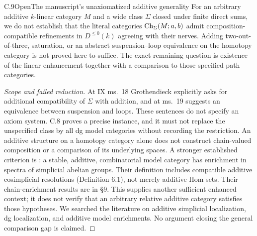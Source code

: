 \begin{result}{C.9}{Open}{The manuscript's unaxiomatized additive generality}
For an arbitrary additive $k$-linear category $M$ and a wide class $\Sigma$ closed under finite direct sums, we do not establish that the literal categories $\operatorname{Ch}_\Sigma(M;a,b)$ admit composition-compatible refinements in $D^{\leq0}(k)$ agreeing with their nerves. Adding two-out-of-three, saturation, or an abstract suspension--loop equivalence on the homotopy category is not proved here to suffice. The exact remaining question is existence of the linear enhancement together with a comparison to those specified path categories.
\end{result}
\begin{proof}[Scope and failed reduction]
At IX ms.~18 Grothendieck explicitly asks for additional compatibility of $\Sigma$ with addition, and at ms.~19 suggests an equivalence between suspension and loops. These sentences do not specify an axiom system. C.8 proves a precise instance, and it must not replace the unspecified class by all dg model categories without recording the restriction. An additive structure on a homotopy category alone does not construct chain-valued composition or a comparison of its underlying spaces. A stronger established criterion is \citet[Theorem 1.3 and Definition 6.2]{DuggerShipley2007}: a stable, additive, combinatorial model category has enrichment in spectra of simplicial abelian groups. Their definition includes compatible additive cosimplicial resolutions (Definition 6.1), not merely additive Hom sets. Their chain-enrichment results are in \S9. This supplies another sufficient enhanced context; it does not verify that an arbitrary relative additive category satisfies those hypotheses. We searched the literature on additive simplicial localization, dg localization, and additive model enrichments. No argument closing the general comparison gap is claimed.
\end{proof}

